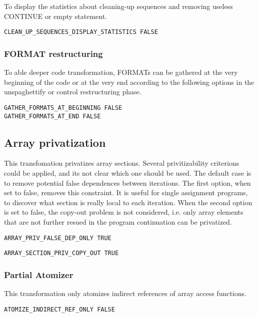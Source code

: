 To display the statistics about cleaning-up sequences and removing
useless CONTINUE or empty statement.
\begin{verbatim}
CLEAN_UP_SEQUENCES_DISPLAY_STATISTICS FALSE
\end{verbatim}


\subsubsection{FORMAT restructuring}

To able deeper code transformation, FORMATs can be gathered at the
very beginning of the code or at the very end according to the
following options in the unspaghettify or control restructuring phase.
\begin{verbatim}
GATHER_FORMATS_AT_BEGINNING FALSE
GATHER_FORMATS_AT_END FALSE
\end{verbatim}


\subsection{Array privatization}

This transfomation privatizes array sections. Several privitizability
criterions could be applied, and its not clear which one should be used. The
default case is to remove potential false dependences between
iterations. The first option, when set to false, removes this
constraint. It is useful for single assignment programs, to discover what
section is really local to each iteration. When the second option is set to
false, the copy-out problem is not considered, i.e. only array elements that
are not further resued in the program continuation can be privatized. 

\begin{verbatim}
ARRAY_PRIV_FALSE_DEP_ONLY TRUE
\end{verbatim}

\begin{verbatim}
ARRAY_SECTION_PRIV_COPY_OUT TRUE
\end{verbatim}

\subsubsection{Partial Atomizer}

This transformation only atomizes indirect references of array access
functions.

\begin{verbatim}
ATOMIZE_INDIRECT_REF_ONLY FALSE
\end{verbatim}

